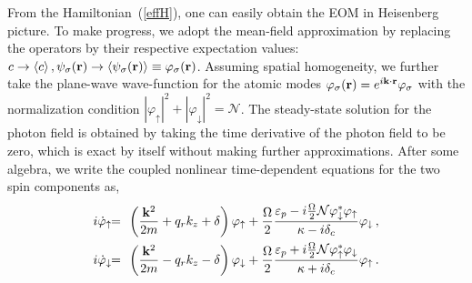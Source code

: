 \documentclass[atoms,article,submit,moreauthors,pdftex,12pt,a4paper]{mdpi}
\def\ba{\begin{eqnarray}}
\def\ea{\end{eqnarray}}
\begin{document}
From the Hamiltonian~(\ref{effH}), one can easily obtain the EOM in Heisenberg picture. To make progress, we adopt the mean-field approximation by replacing the operators by their respective expectation values: $c \rightarrow \langle c \rangle \,, \psi_\sigma ({\bf r}) \rightarrow \langle \psi_\sigma ({\bf r}) \rangle \equiv \varphi_\sigma ({\bf r})$. 
Assuming spatial homogeneity, we further take the plane-wave wave-function for the atomic modes $\varphi_\sigma({\bf r})=e^{i{\bf k}\cdot{\bf r}}\varphi_\sigma$ with the normalization condition $|\varphi_\uparrow|^2+|\varphi_\downarrow|^2=\mathcal{N}$. The steady-state solution for the photon field is obtained by taking the time derivative of the photon field to be zero, which is exact by itself without making further approximations. After some algebra, we write the coupled nonlinear time-dependent equations for the two spin components as, 
\ba
i\dot{\varphi}_{\uparrow}&\!\! =\!\! & \left(\frac{{\bf k}^{2}}{2m}+q_{r}k_{z}+\delta\right) \varphi_{\uparrow}+\frac{\Omega}{2}\frac{\varepsilon_{p}-i\frac{\Omega}{2} \mathcal{N}\varphi_\downarrow^\ast\varphi_\uparrow}{\kappa-i\delta_{c}}\varphi_{\downarrow} \,,\label{EOMphi1}\\
i\dot{\varphi}_{\downarrow} & \!\!= \!\!& \left(\frac{{\bf k}^{2}}{2m}-q_{r}k_{z}-\delta\right)\varphi_{\downarrow}+\frac{\Omega}{2}\frac{\varepsilon_{p}+i\frac{\Omega}{2} \mathcal{N}\varphi_\uparrow^\ast\varphi_\downarrow}{\kappa+i\delta_{c}}\varphi_{\uparrow}\,.\label{EOMphi2}
\ea
\end{document}
